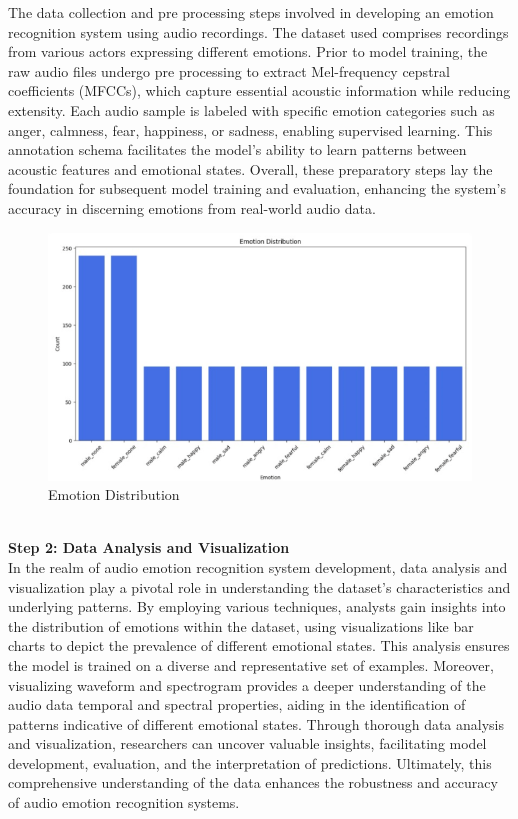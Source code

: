 The data collection and pre processing steps involved in developing an emotion recognition system using audio recordings. The dataset used comprises recordings from various actors expressing different emotions. Prior to model training, the raw audio files undergo pre processing to extract Mel-frequency cepstral coefficients (MFCCs), which capture essential acoustic information while reducing extensity. Each audio sample is labeled with specific emotion categories such as anger, calmness, fear, happiness, or sadness, enabling supervised learning. This annotation schema facilitates the model's ability to learn patterns between acoustic features and emotional states. Overall, these preparatory steps lay the foundation for subsequent model training and evaluation, enhancing the system's accuracy in discerning emotions from real-world audio data.
\\
 \begin{figure}[hbt!]
  \centering
 \includegraphics[width=0.9\linewidth]{C_chap/fig32.png}
     \caption{Emotion Distribution}
\end{figure}
\\
\textbf{Step 2: Data Analysis and Visualization}
\\
In the realm of audio emotion recognition system development, data analysis and visualization play a pivotal role in understanding the dataset's characteristics and underlying patterns. By employing various techniques, analysts gain insights into the distribution of emotions within the dataset, using visualizations like bar charts to depict the prevalence of different emotional states. This analysis ensures the model is trained on a diverse and representative set of examples. Moreover, visualizing waveform and spectrogram provides a deeper understanding of the audio data temporal and spectral properties, aiding in the identification of patterns indicative of different emotional states. Through thorough data analysis and visualization, researchers can uncover valuable insights, facilitating model development, evaluation, and the interpretation of predictions. Ultimately, this comprehensive understanding of the data enhances the robustness and accuracy of audio emotion recognition systems.
